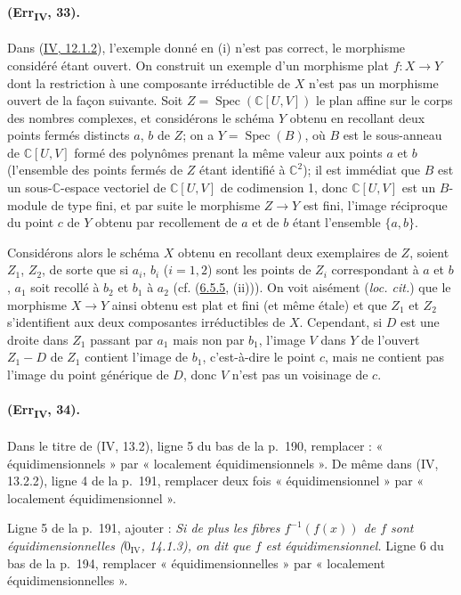 \paragraph{(Err\textsubscript{IV}, 33).}
Dans ({\hyperref[canon-index.ega4.c04.item.12-1-2]{IV, 12.1.2}}), l'exemple donné
en (i) n'est pas correct, le morphisme considéré étant ouvert. On
construit un exemple d'un morphisme plat $f:X\to Y$ dont la restriction
à une composante irréductible de $X$ n'est pas un morphisme ouvert de
la façon suivante. Soit $Z=\operatorname{Spec}(\mathbb C[U,V])$ le
plan affine sur le corps des nombres complexes, et considérons le
schéma $Y$ obtenu en recollant deux points fermés distincts $a$, $b$ de
$Z$; on a $Y=\operatorname{Spec}(B)$, où $B$ est le sous-anneau de
$\mathbb C[U,V]$ formé des polynômes prenant la même valeur aux points
$a$ et $b$ (l'ensemble des points fermés de $Z$ étant identifié à
$\mathbb C^2$); il est immédiat que $B$ est un sous-$\mathbb C$-espace
vectoriel de $\mathbb C[U,V]$ de codimension 1, donc $\mathbb C[U,V]$
est un $B$-module de type fini, et par suite le morphisme $Z\to Y$ est
fini, l'image réciproque du point $c$ de $Y$ obtenu par recollement de
$a$ et de $b$ étant l'ensemble $\{a,b\}$.

Considérons alors le schéma $X$ obtenu en recollant deux exemplaires de
$Z$, soient $Z_1$, $Z_2$, de sorte que si $a_i$, $b_i$ ($i=1,2$) sont
les points de $Z_i$ correspondant à $a$ et $b$, $a_1$ soit recollé à
$b_2$ et $b_1$ à $a_2$ (cf. ({\hyperref[canon-index.ega4.c04.item.6-5-5]{6.5.5}},
(ii))). On voit aisément (\emph{loc. cit.}) que le morphisme $X\to Y$
ainsi obtenu est plat et fini (et même étale) et que $Z_1$ et $Z_2$
s'identifient aux deux composantes irréductibles de $X$. Cependant, si
$D$ est une droite dans $Z_1$ passant par $a_1$ mais non par $b_1$,
l'image $V$ dans $Y$ de l'ouvert $Z_1-D$ de $Z_1$ contient l'image de
$b_1$, c'est-à-dire le point $c$, mais ne contient pas l'image du point
générique de $D$, donc $V$ n'est pas un voisinage de $c$.

\paragraph{(Err\textsubscript{IV}, 34).}
Dans le titre de (IV, 13.2), ligne 5 du bas de la p.~190, remplacer :
« équidimensionnels » par « localement équidimensionnels ». De même
dans (IV, 13.2.2), ligne 4 de la p.~191, remplacer deux fois
« équidimensionnel » par « localement équidimensionnel ».

Ligne 5 de la p.~191, ajouter : \emph{Si de plus les fibres
$f^{-1}(f(x))$ de $f$ sont équidimensionnelles ($0_{\mathrm{IV}}$,
14.1.3), on dit que $f$ est équidimensionnel.} Ligne 6 du bas de la
p.~194, remplacer « équidimensionnelles » par « localement
équidimensionnelles ».

